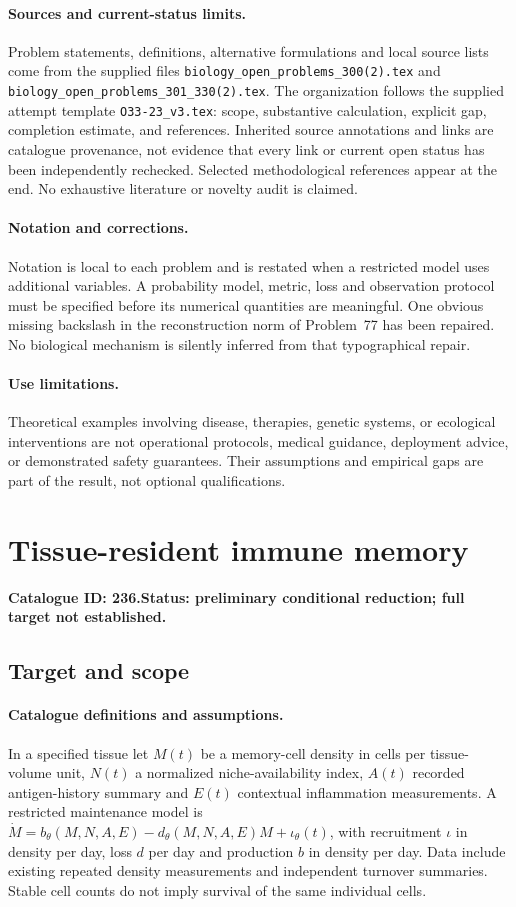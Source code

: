 \documentclass[11pt]{article}
\begin{document}
\paragraph{Sources and current-status limits.}
Problem statements, definitions, alternative formulations and local source lists
come from the supplied files
\texttt{biology\_open\_problems\_300(2).tex} and
\texttt{biology\_open\_problems\_301\_330(2).tex}.
The organization follows the supplied attempt template
\texttt{O33-23\_v3.tex}: scope, substantive calculation, explicit gap,
completion estimate, and references. Inherited source annotations and links are
catalogue provenance, not evidence that every link or current open status has
been independently rechecked. Selected methodological references appear at the
end. No exhaustive literature or novelty audit is claimed.

\paragraph{Notation and corrections.}
Notation is local to each problem and is restated when a restricted model uses
additional variables. A probability model, metric, loss and observation protocol
must be specified before its numerical quantities are meaningful. One obvious
missing backslash in the reconstruction norm of Problem~77 has been repaired.
No biological mechanism is silently inferred from that typographical repair.

\paragraph{Use limitations.}
Theoretical examples involving disease, therapies, genetic systems, or ecological
interventions are not operational protocols, medical guidance, deployment advice,
or demonstrated safety guarantees. Their assumptions and empirical gaps are part
of the result, not optional qualifications.

\setcounter{section}{235}
\section{Tissue-resident immune memory}
\label{prob:236}
\noindent\textbf{Catalogue ID: 236.}\quad \textbf{Status: preliminary conditional reduction; full target not established.}
\subsection{Target and scope}
\paragraph{Catalogue definitions and assumptions.}
In a specified tissue let $M(t)$ be a memory-cell density in cells per tissue-volume unit, $N(t)$ a normalized niche-availability index, $A(t)$ recorded antigen-history summary and $E(t)$ contextual inflammation measurements. A restricted maintenance model is $\dot M=b_\theta(M,N,A,E)-d_\theta(M,N,A,E)M+\iota_\theta(t)$, with recruitment $\iota$ in density per day, loss $d$ per day and production $b$ in density per day. Data include existing repeated density measurements and independent turnover summaries. Stable cell counts do not imply survival of the same individual cells.
\end{document}
